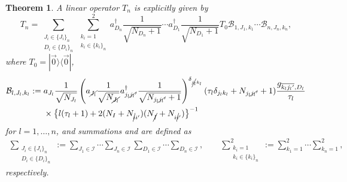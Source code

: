 \documentclass[pdftex]{sigma}
\numberwithin{equation}{section}
\newtheorem{Theorem}{Theorem}[section]
\begin{document}
\begin{Theorem}\label{thm_left_coeff_opr}
A linear operator $T_{n}$ is explicitly given by
\[%
 T_{n}
 =
 \sum_{
 \substack{
 J_{i}
 \in
 \{J_{i}\}_{n}\\
 D_{i}
 \in
 \{D_{i}\}_{n}
 }
 }
 \sum_{
 \substack{
 k_{i}=1
 \\
 k_{i}
 \in
 \{
 k_{i}
 \}_{n}
 }
 }^{2}
 a_{D_{n}}^{\dagger}
 \frac{1}{
 \sqrt{
 N_{D_{n}}
 +
 1
 }
 }
 \cdots
 a_{D_{1}}^{\dagger}
 \frac{1}{
 \sqrt{
 N_{D_{1}}
 +
 1
 }
 }
 T_{0}
 \mathcal{B}_{
 1,
 J_{1},
 k_{1}
 }
 \cdots
 \mathcal{B}_{
 n,
 J_{n},
 k_{n}
 },
\]
where
$
T_{0}
=
|
\vec{0}
\rangle
\langle
\vec{0}
|
$,
\begin{align*}%
 \mathcal{B}_{
 l,
 J_{l},
 k_{l}
 }
 :={}&
 a_{J_{l}}
 \frac{1}{\sqrt{N_{J_{l}}}}
 \left(
 a_{\cancel{J_{l}}}
 \frac{1}{
 \sqrt{
 N_{\cancel{J_{l}}}
 }
 }
 a_{j_{l}\cancel{j_{l}}'}^{\dagger}
 \frac{1}{
 \sqrt{
 N_{j_{l}\cancel{j_{l}}'}+1
 }
 }
 \right)^{\delta_{\cancel{j_{l}}k_{l}}}
 (
 \tau_{l}
 \delta_{j_{l}k_{l}}
 +
 N_{j_{l}\cancel{j_{l}}'}
 +
 1
 )
 \frac{
 g_{\overline{k_{l}{j_{l}}'},D_{l}}
 }{
 \tau_{l}
 }
 \nonumber
 \\
 &
 \times
 \left\{
 l
 (
 \tau_{l}
 +
 1
 )
 +
 2
 (
 N_{I}
 +
 N_{\cancel{i}i'}
 )
 (
 N_{\cancel{I}}
 +
 N_{i\cancel{i}'}
 )
 \right\}^{-1}
\end{align*}
for $l=1,\dots,n$, and summations
and
are defined as
\begin{align*}
 \sum_{
 \substack{
 J_{i}
 \in
 \{J_{i}\}_{n}\\
 D_{i}
 \in
 \{D_{i}\}_{n}
 }
 }
 :=
 \sum_{
 J_{1}
 \in
 \mathcal{I}
 }
 \cdots
 \sum_{
 J_{n}
 \in
 \mathcal{I}
 }
 \sum_{
 D_{1}
 \in
 \mathcal{I}
 }
 \cdots
 \sum_{
 D_{n}
 \in
 \mathcal{I}
 },
 \qquad
 \sum_{
 \substack{
 k_{i}=1
 \\
 k_{i}
 \in
 \{
 k_{i}
 \}_{n}
 }
 }^{2}
 :=
 \sum_{
 k_{1}
 =1
 }^{2}
 \cdots
 \sum_{
 k_{n}
 =
 1
 }^{2},
\end{align*}
respectively.
\end{Theorem}
\end{document}

